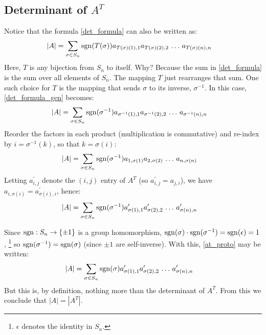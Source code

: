 \documentclass{article}
\begin{document}
\subsection{Determinant of $A^T$}
Notice that the formula \eqref{det_formula} can also be written as:
\begin{align}
  |A| &= \sum_{\sigma \in S_n} {\rm sgn}(T(\sigma))
            a_{T(\sigma)(1), 1} a_{T(\sigma)(2),2} \, \ldots \, a_{T(\sigma)(n), n}
            \label{det_formula_gen}
\end{align}
Here, $T$ is any bijection from $S_n$ to itself. Why? Because the sum in
\eqref{det_formula} is the sum over all elements of $S_n$. The mapping $T$ just
rearranges that sum. One such choice for $T$ is the mapping that sends $\sigma$
to its inverse, $\sigma^{-1}$. In this case, \eqref{det_formula_gen} becomes:
\begin{align}
  |A| &= \sum_{\sigma \in S_n} {\rm sgn}(\sigma^{-1})
            a_{\sigma^{-1}(1), 1} a_{\sigma^{-1}(2),2} \, \ldots \, a_{\sigma^{-1}(n), n}
\end{align}
Reorder the factors in each product (multiplication is commutative) and
re-index by $i = \sigma^{-1}(k)$, so that $k = \sigma(i)$:
\begin{align}
  |A| &= \sum_{\sigma \in S_n} {\rm sgn}(\sigma^{-1})
            a_{1, \sigma(1)}  a_{2, \sigma(2)} \, \ldots \, a_{n, \sigma(n)}
\end{align}
Letting $a_{i,j}^\prime$ denote the $(i,j)$ entry of $A^T$ (so
$a_{i,j}^\prime = a_{j,i}$), we have $a_{i, \sigma(i)} = a_{\sigma(i), i}^\prime$,
hence:
\begin{align}
  |A| &= \sum_{\sigma \in S_n} {\rm sgn}(\sigma^{-1}) a_{\sigma(1),1}^\prime
            a_{\sigma(2),2}^\prime \, \ldots \, a_{\sigma(n),n}^\prime \label{at_proto}
\end{align}

Since ${\rm sgn}: S_n \to \{\pm 1\}$ is a group homomorphism,
${\rm sgn}(\sigma) \cdot {\rm sgn}(\sigma^{-1}) = {\rm sgn}(\epsilon) = 1$,%
\footnote{$\epsilon$ denotes the identity in $S_n$.}
so ${\rm sgn}(\sigma^{-1}) = {\rm sgn}(\sigma)$ (since $\pm 1$ are self-inverse).
With this, \eqref{at_proto} may be written:
\begin{align}
  |A| &= \sum_{\sigma \in S_n} {\rm sgn}(\sigma)
            a_{\sigma(1),1}^\prime  a_{\sigma(2),2}^\prime \, \ldots \, a_{\sigma(n),n}^\prime
            \label{det_at}
\end{align}
But this is, by definition, nothing more than the determinant of $A^T$.
From this we conclude that $|A| = |A^T|$.
\end{document}
